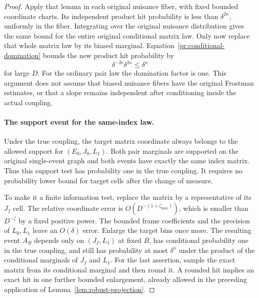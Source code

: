 \begin{proof}
Apply that lemma in each original nuisance fiber, with fixed
bounded coordinate charts. Its independent product hit
probability is less than $\delta^{2\kappa}$, uniformly in the
fiber. Integrating over the original nuisance distribution gives
the same bound for the entire original conditional matrix law.
Only now replace that whole matrix law by its biased marginal.
Equation~\eqref{pr:conditional-domination} bounds the new product
hit probability by
\begin{equation}
 \delta^{-2\epsilon}\delta^{2\kappa}
       \le\delta^{\kappa}
\label{pr:biased-product-hit}
\end{equation}
for large $D$. For the ordinary pair law the domination factor is
one. This argument does not assume that biased nuisance fibers
have the original Frostman estimates, or that a slope remains
independent after conditioning inside the actual coupling.

\paragraph{The support event for the same-index law.}
Under the true coupling, the target matrix coordinate always
belongs to the allowed support for $(E_0,J_0,L_1)$.
Both pair marginals are supported on the original single-event
graph and both events have exactly the same index matrix. Thus
this support test has probability one in the true coupling.
It requires no probability lower bound for target cells after
the change of measure.

To make it a finite information test, replace the matrix by a
representative of its $J_f$ cell. The relative coordinate error
is $O(D^{-(1+\zeta_{\max})})$, which is smaller than
$D^{-\zeta}$ by a fixed positive power. The bounded frame
coefficients and the precision of $L_0,L_1$ leave an
$O(\delta)$ error. Enlarge the target bins once more.
The resulting event $A_B$ depends only on $(J_f,L_1)$ at fixed
$B$, has conditional probability one in the true coupling, and
still has probability at most $\delta^\kappa$ under the product
of the conditional marginals of $J_f$ and $L_1$.
For the last assertion, sample the exact matrix from its
conditional marginal and then round it. A rounded hit implies
an exact hit in one further bounded enlargement, already allowed
in the preceding application of Lemma~\ref{lem:robust-projection}.


\end{proof}
